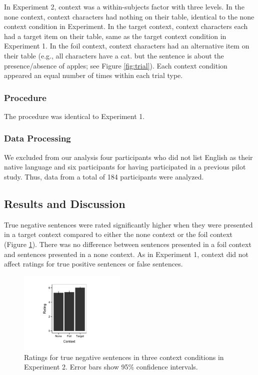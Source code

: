 \documentclass[10pt,letterpaper]{article}
\begin{document}
In Experiment 2, context was a within-subjects factor with three levels. In the none context, context characters had nothing on their table, identical to the none context condition in Experiment. In the target context, context characters each had a target item on their table, same as the target context condition in Experiment 1. In the foil context, context characters had an alternative item on their table (e.g., all characters have a cat. but the sentence is about the presence/absence of apples; see Figure \ref{fig:trial}).  Each context condition appeared an equal number of times within each trial type.  

\subsubsection{Procedure}

The procedure was identical to Experiment 1.

\subsubsection{Data Processing}

We excluded from our analysis four participants who did not list English as their native language and six participants for having participated in a previous pilot study.  Thus, data from a total of 184 participants were analyzed.  

\subsection{Results and Discussion}

True negative sentences were rated significantly higher when they were presented in a target context compared to either the none context or the foil context (Figure \ref{fig:s2}).  There was no difference between sentences presented in a foil context and sentences presented in a none context.  As in Experiment 1, context did not affect ratings for true positive sentences or false sentences.  

\begin{figure}
\begin{center} 
\includegraphics[width=2in]{figures/study2.pdf}
\caption{\label{fig:s2} Ratings for true negative sentences in three context conditions in Experiment 2.  Error bars show 95\% confidence intervals.}
\end{center} 
\end{figure}
\end{document}
